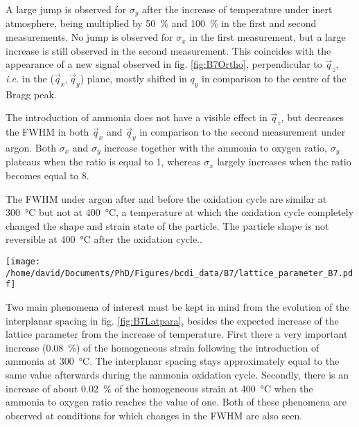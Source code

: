 A large jump is observed for $\sigma_y$ after the increase of temperature under inert atmosphere, being multiplied by \qty{50}{\percent} and \qty{100}{\percent} in the first and second measurements.
No jump is observed for $\sigma_x$ in the first measurement, but a large increase is still observed in the second measurement.
This coincides with the appearance of a new signal observed in fig. \ref{fig:B7Ortho}, perpendicular to $\vec{q}_z$, \textit{i.e.} in the ($\vec{q}_x, \vec{q}_y$) plane, mostly shifted in $q_y$ in comparison to the centre of the Bragg peak.

The introduction of ammonia does not have a visible effect in $\vec{q}_z$, but decreases the FWHM in both $\vec{q}_x$ and $\vec{q}_y$ in comparison to the second measurement under argon.
Both $\sigma_x$ and $\sigma_y$ increase together with the ammonia to oxygen ratio, $\sigma_y$ plateaus when the ratio is equal to 1, whereas $\sigma_x$ largely increases when the ratio becomes equal to 8.

The FWHM under argon after and before the oxidation cycle are similar at \qty{300}{\degreeCelsius} but not at \qty{400}{\degreeCelsius}, a temperature at which the oxidation cycle completely changed the shape and strain state of the particle.
The particle shape is not reversible at \qty{400}{\degreeCelsius} after the oxidation cycle..

\begin{SCfigure}
    \centering
    \texttt{[image: /home/david/Documents/PhD/Figures/bcdi\_data/B7/lattice\_parameter\_B7.pdf]}
    \caption{
        Evolution of the interplanar spacing $d_{111}$ and homogeneous strain $\epsilon_{111, homo}$ for particle B as a function of the ammonia to oxygen ratio.
        The reference for the computation of $\epsilon_{111, homo}$ was taken as the mean value at \qty{25}{\degreeCelsius}.
        The reproduction of measurements at fixed conditions yield multiple data points, lines at \qty{300}{\degreeCelsius} and \qty{400}{\degreeCelsius} link the data points in the order of the measurements.
    }
    \label{fig:B7Latpara}
\end{SCfigure}

Two main phenomena of interest must be kept in mind from the evolution of the interplanar spacing in fig. \ref{fig:B7Latpara}, besides the expected increase of the lattice parameter from the increase of temperature.
First there a very important increase (\qty{0.08}{\percent}) of the homogeneous strain following the introduction of ammonia at \qty{300}{\degreeCelsius}.
The interplanar spacing stays approximately equal to the same value afterwards during the ammonia oxidation cycle.
Secondly, there is an increase of about \qty{0.02}{\percent} of the homogeneous strain at \qty{400}{\degreeCelsius} when the ammonia to oxygen ratio reaches the value of one.
Both of these phenomena are observed at conditions for which changes in the FWHM are also seen.

